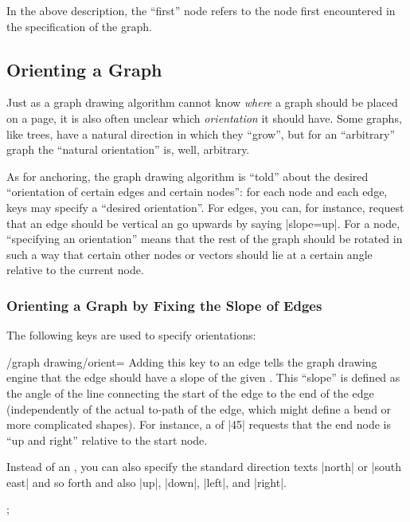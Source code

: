 In the above description, the ``first'' node refers to the node first
encountered in the specification of the graph.



\subsection{Orienting a Graph}

\label{subsection-library-graphdrawing-standard-orientation}

Just as a graph drawing algorithm cannot know \emph{where} a graph
should be placed on a page, it is also often unclear which
\emph{orientation} it should have. Some graphs, like trees, have a
natural direction in which they ``grow'', but for an ``arbitrary''
graph the ``natural orientation'' is, well, arbitrary.

As for anchoring, the graph drawing algorithm is ``told'' about
the desired ``orientation of certain edges and certain nodes'': for
each node and each edge, keys may specify a ``desired
orientation''. For edges, you can, for instance, request that an
edge should be vertical an go upwards by saying |slope=up|. For a
node, ``specifying an orientation'' means that the rest of the graph
should be rotated in such a way that certain other nodes or
vectors should lie at a certain angle relative to the current node.


\subsubsection{Orienting a Graph by Fixing the Slope of Edges}

The following keys are used to specify orientations:
\begin{key}{/graph drawing/orient=}
  Adding this key to an edge tells the graph drawing engine that the
  edge should have a slope of the given . This ``slope''
  is defined as the angle of the line connecting the start of the edge
  to the end of the edge (independently of the actual to-path of the
  edge, which might define a bend or more complicated shapes). For
  instance, a  of |45| requests that the end node is ``up
  and right'' relative to the start node.
  
  Instead of an , you can also specify the standard
  direction texts |north| or |south east| and so forth and also
  |up|, |down|, |left|, and |right|.
    
\begin{codeexample}[]
\tikz {};
\end{codeexample}
\end{key}

